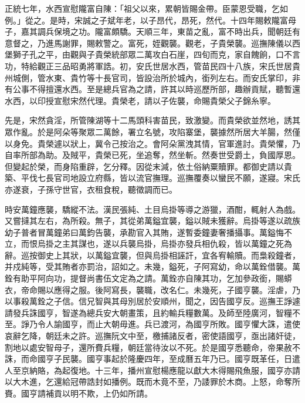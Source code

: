 \begin{pinyinscope}
正統七年，水西宣慰隴富自陳：「祖父以來，累朝皆賜金帶。臣蒙恩受職，乞如例。」從之。是時，宋誠之子斌年老，以子昂代，昂死，然代。十四年賜敕隴富母子，嘉其調兵保境之功。隴富頗驕。天順三年，東苗之亂，富不時出兵，聞朝廷有意督之，乃進馬謝罪，賜敕警之。富死，姪觀襲。觀老，子貴榮襲。巡撫陳儀以西堡獅子孔之平，由觀與子貴榮統部眾二萬攻白石崖，四旬而克，家自餽餉，口不言功，特給觀正三品昭勇將軍誥。初，安氏世居水西，管苗民四十八族，宋氏世居貴州城側，管水東、貴竹等十長官司，皆設治所於城內，銜列左右。而安氏掌印，非有公事不得擅還水西。至是總兵官為之請，許其以時巡歷所部，趣辦貢賦，聽暫還水西，以印授宣慰宋然代理。貴榮老，請以子佐襲，命賜貴榮父子錦糸寧。

先是，宋然貪淫，所管陳湖等十二馬頭科害苗民，致激變。而貴榮欲並然地，誘其眾作亂。於是阿朵等聚眾二萬餘，署立名號，攻陷寨堡，襲據然所居大羊腸，然僅以身免。貴榮遽以狀上，冀令己按治之。會阿朵黨洩其情，官軍進討。貴榮懼，乃自率所部為助。及賊平，貴榮已死，坐追奪，然坐斬。然奏世受爵土，負國厚恩。但變起於榮，而身陷重辟，乞分釋。因從末減，依土俗納粟贖罪。都御史請以貴築、平伐七長官司地設立府縣，皆以流官撫理。巡撫覆奏以蠻民不願，遂寢。宋氏亦遂衰，子孫守世官，衣租食稅，聽徵調而已。

時安萬鐘應襲，驕縱不法。漢民張純、土目烏掛等導之游獵，酒酣，輒射人為戲。又嘗撻其左右，為所殺。無子，其從弟萬鎰宜襲，鎰以賊未獲辭。烏掛等遂以疏族幼子普者冒萬鐘弟曰萬鈞告襲，承勘官入其賄，遂暫委鐘妻奢播攝事。萬鎰悔不立，而恨烏掛之主其謀也，遂以兵襲烏掛，烏掛亦發兵相仇殺，皆以萬鐘之死為辭。巡按御史上其狀，以萬鎰宜襲，但與烏掛相誣訐，宜各宥輸贖。而梟殺鐘者，并戍純等，受其賄者亦罰治，詔如之。未幾，鎰死，子阿寫幼，命以萬銓借襲。萬銓有助平阿向功，提督尚書伍文定為之請。萬銓亦自陳其功，乞加參政銜，賜蟒衣，帝命賜以應得之服。後阿寫長，襲職，改名仁。未幾死，子國亨襲。淫虐，乃以事殺萬銓之子信。信兄智與其母別居於安順州，聞之，因告國亨反。巡撫王諍遽請發兵誅國亨，智遂為總兵安大朝畫策，且約輸兵糧數萬。及師至陸廣河，智糧不至。諍乃令人諭國亨，而止大朝毋進。兵已渡河，為國亨所敗。國亨懼大誅，遣使哀辭乞降，朝廷未之許。巡撫阮文中至，檄捕諸反者，密使語國亨，亟出諸奸徒，割地以處安智母子，還所費兵糧，朝廷當待汝以不死。於是國亨悉聽命，帝果赦不誅，而命國亨子民襲。國亨事起於隆慶四年，至成曆五年乃已。國亨既革任，日遣人至京納賂，為起復地。十三年，播州宣慰楊應龍以獻大木得賜飛魚服，國亨亦請以大木進，乞還給冠帶誥封如播例。既而木竟不至，乃諉罪於木商。上怒，命奪所賚。國亨請補貢以明不欺，上仍如所請。


\end{pinyinscope}
